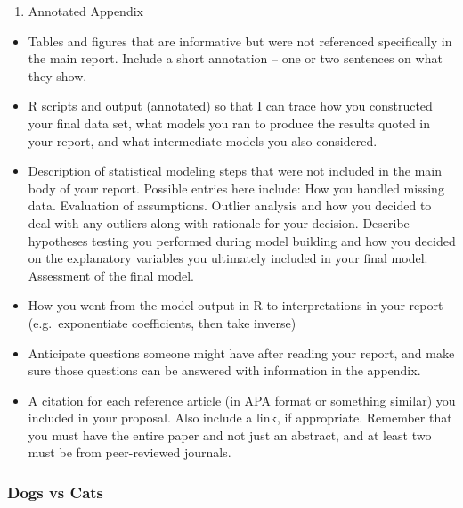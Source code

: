 \documentclass[]{article}
\providecommand{\tightlist}{%
  \setlength{\itemsep}{0pt}\setlength{\parskip}{0pt}}
\begin{document}
\begin{enumerate}
\def\labelenumi{\arabic{enumi}.}
\setcounter{enumi}{4}
\tightlist
\item
  Annotated Appendix
\end{enumerate}

\begin{itemize}
\tightlist
\item
  Tables and figures that are informative but were not referenced
  specifically in the main report. Include a short annotation -- one or
  two sentences on what they show.
\item
  R scripts and output (annotated) so that I can trace how you
  constructed your final data set, what models you ran to produce the
  results quoted in your report, and what intermediate models you also
  considered.
\item
  Description of statistical modeling steps that were not included in
  the main body of your report. Possible entries here include: How you
  handled missing data. Evaluation of assumptions. Outlier analysis and
  how you decided to deal with any outliers along with rationale for
  your decision. Describe hypotheses testing you performed during model
  building and how you decided on the explanatory variables you
  ultimately included in your final model. Assessment of the final
  model.
\item
  How you went from the model output in R to interpretations in your
  report (e.g.~exponentiate coefficients, then take inverse)
\item
  Anticipate questions someone might have after reading your report, and
  make sure those questions can be answered with information in the
  appendix.
\item
  A citation for each reference article (in APA format or something
  similar) you included in your proposal. Also include a link, if
  appropriate. Remember that you must have the entire paper and not just
  an abstract, and at least two must be from peer-reviewed journals.
\end{itemize}

\subsubsection{Dogs vs Cats}\label{dogs-vs-cats}
\end{document}
